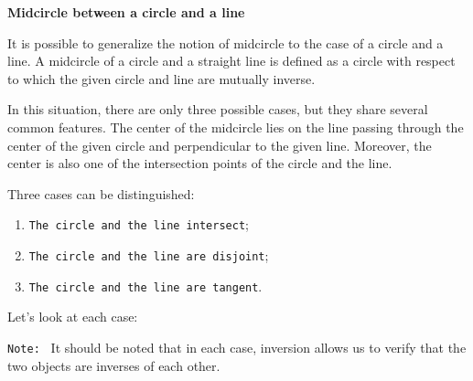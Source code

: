 \textbf{Midcircle between a circle and a line}

It is possible to generalize the notion of midcircle to the case of a circle and a line.
A midcircle of a circle and a straight line is defined as a circle with respect to which the given circle and line are mutually inverse.


In this situation, there are only three possible cases, but they share several common features.
The center of the midcircle lies on the line passing through the center of the given circle and perpendicular to the given line.
Moreover, the center is also one of the intersection points of the circle and the line.

Three cases can be distinguished:

\begin{enumerate}[label=(\roman*)]
  \item \texttt{The circle and the line intersect};
  \item \texttt{The circle and the line are disjoint};
  \item \texttt{The circle and the line are tangent}.
\end{enumerate}

Let's look at each case:

\texttt{Note: } It should be noted that in each case, inversion allows us to verify that the two objects are inverses of each other.


